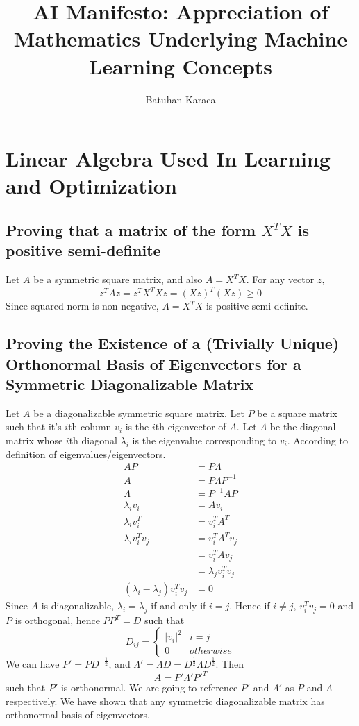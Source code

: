 \documentclass{article}
\title{AI Manifesto: Appreciation of Mathematics Underlying Machine Learning Concepts}
\author{Batuhan Karaca}
\numberwithin{equation}{subsection}
\begin{document}
\maketitle
\tableofcontents

\section{Linear Algebra Used In Learning and Optimization}
\subsection{Proving that a matrix of the form $X^TX$ is positive semi-definite}
Let $A$ be a symmetric square matrix, and also $A=X^TX$. For any vector $z$, 
\begin{equation}
z^TAz = z^TX^TXz = (Xz)^T(Xz) \geq 0
\end{equation}
Since squared norm is non-negative, $A=X^TX$ is positive semi-definite.
\subsection{Proving the Existence of a (Trivially Unique) Orthonormal Basis of Eigenvectors for a Symmetric Diagonalizable Matrix}
Let $A$ be a diagonalizable symmetric square matrix. Let $P$ be a square matrix such that it's $i$th column $v_i$ is the $i$th eigenvector of $A$. Let $\Lambda$ be the diagonal matrix whose $i$th diagonal $\lambda_i$ is the eigenvalue corresponding to $v_i$. According to definition of eigenvalues/eigenvectors.
\begin{align}
    AP &= P\Lambda\\
    A &= P\Lambda P^{-1}\\
    \Lambda &= P^{-1}AP\\
    \lambda_iv_i &= Av_i\\
    \lambda_iv_i^T &= v_i^TA^T\\
    \lambda_iv_i^Tv_j &= v_i^TA^Tv_j\\
    &= v_i^TAv_j\\
    &= \lambda_jv_i^Tv_j\\
    (\lambda_i-\lambda_j)v_i^Tv_j &= 0
\end{align}
Since $A$ is diagonalizable, $\lambda_i=\lambda_j$ if and only if $i=j$. Hence if $i \neq j$, $v_i^Tv_j = 0$ and $P$ is orthogonal, hence 
$PP^T = D$ such that 
\begin{equation}
D_{ij} = \begin{cases}
    |v_i|^2 & i = j\\
    0 & otherwise
\end{cases}
\end{equation}
We can have $P' = PD^{-\frac{1}{2}}$, and $\Lambda' = \Lambda D = D^{\frac{1}{2}} \Lambda D^{\frac{1}{2}}$. Then
\begin{equation}
    A = P'\Lambda'P'^T 
\end{equation}
such that $P'$ is orthonormal. We are going to reference $P'$ and $\Lambda'$ as $P$ and $\Lambda$ respectively. We have shown that any symmetric diagonalizable matrix has orthonormal basis of eigenvectors.
\end{document}
